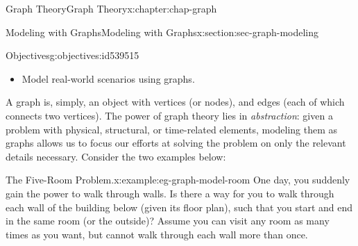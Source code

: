 \documentclass[oneside,10pt,]{book}
\numberwithin{equation}{section}
\begin{document}
\begin{chapterptx}{Graph Theory}{}{Graph Theory}{}{}{x:chapter:chap-graph}
%
%
\typeout{************************************************}
\typeout{************************************************}
%
\begin{sectionptx}{Modeling with Graphs}{}{Modeling with Graphs}{}{}{x:section:sec-graph-modeling}
\begin{objectives}{Objectives}{g:objectives:id539515}
%
\begin{itemize}[label=\textbullet]
\item{}Model real-world scenarios using graphs.%
\end{itemize}
\end{objectives}
A graph is, simply, an object with vertices (or nodes), and edges (each of which connects two vertices). The power of graph theory lies in \emph{abstraction}: given a problem with physical, structural, or time-related elements, modeling them as graphs allows us to focus our efforts at solving the problem on only the relevant details necessary. Consider the two examples below:%
\begin{example}{The Five-Room Problem.}{x:example:eg-graph-model-room}%
One day, you suddenly gain the power to walk through walls. Is there a way for you to walk through each wall of the building below (given its floor plan), such that you start and end in the same room (or the outside)? Assume you can visit any room as many times as you want, but cannot walk through each wall more than once.%
\begin{sidebyside}{1}{0.3}{0.3}{0}%
\begin{sbspanel}{0.4}%
%
\end{sbspanel}%
\end{sidebyside}%
\par

\end{example}
\end{sectionptx}
\end{chapterptx}
\end{document}
